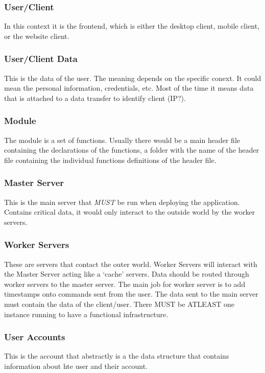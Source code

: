 \documentclass[a4paper]{article}
\begin{document}
\subsubsection{User/Client}
In this context it is the frontend, which is either the desktop client,
mobile client, or the website client.

\subsubsection{User/Client Data}
This is the data of the user. The meaning depends on the specific conext. It
could mean the personal information, credentials, etc. Most of the time it
means data that is attached to a data transfer to identify client (IP?).

\subsubsection{Module}
The module is a set of functions. Usually there would be a main header file
containing the declarations of the functions, a folder with the name of the
header file containing the individual functions definitions of the header file.

\subsubsection{Master Server}
This is the main server that \emph{MUST} be run when deploying the application.
Contains critical data, it would only interact to the outside world by the
worker servers.

\subsubsection{Worker Servers}
These are servers that contact the outer world. Worker Servers will
interact with the Master Server acting like a `cache' servers. Data should be 
routed through worker servers to the master server. The main job for worker 
server is to add timestamps onto commands sent from the user. The data sent to
the main server must contain the data of the client/user. There MUST be ATLEAST
one instance running to have a functional infrastructure.

\subsubsection{User Accounts}
This is the account that abstractly is a the data structure that contains
information about hte user and their account.
\end{document}
